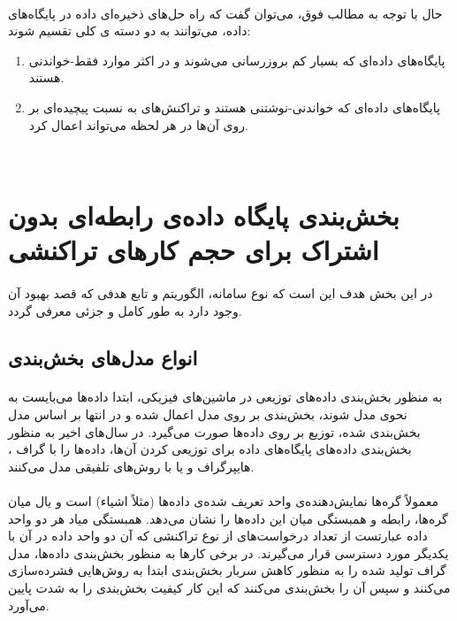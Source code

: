 \paragraph*{}
حال با توجه به مطالب فوق، می‌توان گفت که راه حل‌های ذخیره‌ای داده در پایگاه‌های داده، می‌توانند به دو دسته ی کلی تقسیم شوند:

\begin{enumerate}
	\item
پایگاه‌های داده‌ای که بسیار کم بروزرسانی می‌شوند و در اکثر موارد فقط-خواندنی هستند.
	\item
پایگاه‌های داده‌ای که خواندنی-نوشتنی هستند و تراکنش‌های به نسبت پیچیده‌ای بر روی آن‌ها در هر لحظه می‌تواند اعمال کرد.
\end{enumerate}

‌\section{بخش‌بندی پایگاه داده‌ی رابطه‌ای بدون اشتراک برای حجم کارهای تراکنشی}

\paragraph*{}
در این بخش هدف این است که نوع سامانه، الگوریتم و تابع هدفی که قصد بهبود آن وجود دارد به طور کامل و جزئی معرفی گردد.

\subsection{انواع مدل‌های بخش‌بندی}

\paragraph*{}
به منظور بخش‌بندی داده‌های توزیعی در ماشین‌های فیزیکی، ابتدا داده‌ها می‌بایست به نحوی مدل شوند، بخش‌بندی بر روی مدل اعمال شده و در انتها بر اساس مدل بخش‌بندی شده، توزیع بر روی داده‌ها صورت می‌گیرد. در سال‌های اخیر به منظور بخش‌بندی داده‌های پایگاه‌های داده برای توزیعی کردن آن‌ها، داده‌ها را با گراف
،
هایپرگراف
و یا با روش‌های تلفیقی
مدل می‌کنند.
\cite{kamal-2016}

\paragraph*{}
معمولاً  گره‌ها نمایش‌دهنده‌ی واحد تعریف شده‌ی داده‌ها (مثلاً اشیاء) است و یال میان گره‌ها، رابطه و همبستگی میان این داده‌ها را نشان می‌دهد. همبستگی میاد هر دو واحد داده عبارتست از تعداد درخواست‌های از نوع تراکنشی که آن دو واحد داده در آن با یکدیگر مورد دسترسی قرار می‌گیرند. در برخی کارها به منظور بخش‌بندی داده‌ها، مدل گراف تولید شده را به منظور کاهش سربار بخش‌بندی ابتدا به روش‌هایی فشرده‌سازی می‌کنند و سپس آن را بخش‌بندی می‌کنند که این کار کیفیت بخش‌بندی را به شدت پایین می‌آورد.
\cite{schism-2010}

